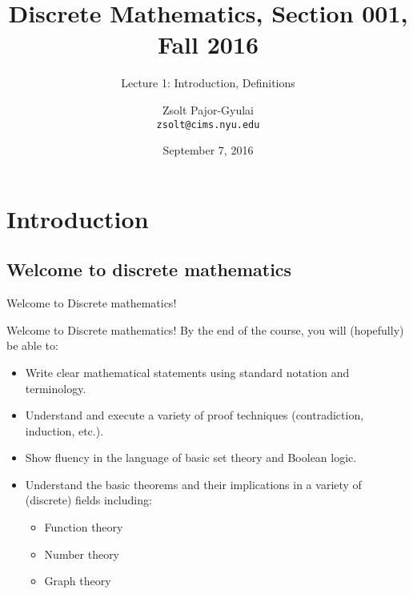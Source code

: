 \documentclass{beamer}
\title{Discrete Mathematics, Section 001, Fall 2016}
\subtitle{Lecture 1: Introduction, Definitions}
\date{September 7, 2016}
\author[Zsolt]{Zsolt Pajor-Gyulai \\ \texttt{zsolt@cims.nyu.edu}}
\institute[NYU] 
{
\normalsize Courant Institute of Mathematical Sciences
}
\begin{document}
\begin{frame}
  \titlepage
\end{frame}


\section{Introduction}
\subsection{Welcome to discrete mathematics}

\begin{frame}{Welcome to Discrete mathematics!}

\vspace{1cm}

\noindent
{}
\vspace{0.5cm}


\end{frame}

\begin{frame}{Welcome to Discrete mathematics!}
By the end of the course, you will (hopefully) be able to:
\begin{itemize}
\item Write clear mathematical statements using standard notation and terminology.\pause
\item Understand and execute a variety of proof techniques (contradiction, induction, etc.).\pause
\item Show fluency in the language of basic set theory and Boolean logic.\pause
\item Understand the basic theorems and their implications in a variety of (discrete) fields including:
\begin{itemize}
\item Function theory
\item Number theory
\item Graph theory
\end{itemize}
\end{itemize}
\end{frame}
\end{document}
